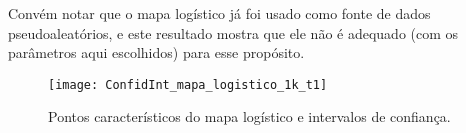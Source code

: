 Convém notar que o mapa logístico já foi usado como fonte de dados pseudoaleatórios, e este resultado mostra que ele não é adequado (com os parâmetros aqui escolhidos) para esse propósito.

\begin{figure}
	\centering
	\texttt{[image: ConfidInt\_mapa\_logistico\_1k\_t1]}
	\caption{Pontos característicos do mapa logístico e intervalos de confiança.}\label{Fig:ConfidInt_mapa_logistico_1k_t1}
\end{figure}


